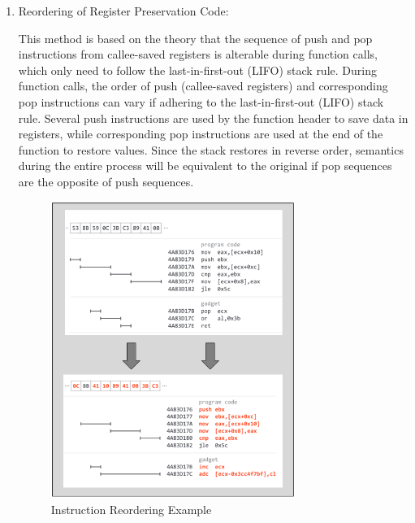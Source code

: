\begin{enumerate}
\item Reordering of Register Preservation Code:

This method is based on the theory that the sequence of push and pop instructions from callee-saved registers is alterable during function calls, which only need to follow the last-in-first-out (LIFO) stack rule. During function calls, the order of push (callee-saved registers) and corresponding pop instructions can vary if adhering to the last-in-first-out (LIFO) stack rule. Several push instructions are used by the function header to save data in registers, while corresponding pop instructions are used at the end of the function to restore values. Since the stack restores in reverse order, semantics during the entire process will be equivalent to the original if pop sequences are the opposite of push sequences.

\begin{figure}[hbt]
	\centering
	\includegraphics[width=0.75\textwidth]{figures/4.3}
	\caption{Instruction Reordering Example}\label{fig:4.3}
\end{figure}


\end{enumerate}
